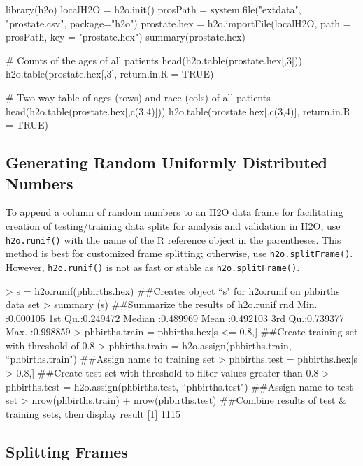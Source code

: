 \documentclass[11pt]{article}
\begin{document}
\begin{enumerate}
\begin{spverbatim}

library(h2o)
localH2O = h2o.init()
prosPath = system.file("extdata", "prostate.csv", package="h2o")
prostate.hex = h2o.importFile(localH2O, path = prosPath, key = "prostate.hex")
summary(prostate.hex)

# Counts of the ages of all patients
head(h2o.table(prostate.hex[,3]))
h2o.table(prostate.hex[,3], return.in.R = TRUE)

# Two-way table of ages (rows) and race (cols) of all patients
head(h2o.table(prostate.hex[,c(3,4)]))
h2o.table(prostate.hex[,c(3,4)], return.in.R = TRUE)
\end{spverbatim}


\subsection{Generating Random Uniformly Distributed Numbers}

To append a column of random numbers to an H2O data frame for facilitating creation of testing/training data splits for analysis and validation in H2O, use {\texttt{h2o.runif()}} with the name of the R reference object in the parentheses. This method is best for customized frame splitting; otherwise, use {\texttt{h2o.splitFrame()}}. However, {\texttt{h2o.runif()}} is not as fast or stable as {\texttt{h2o.splitFrame()}}. 

\begin{spverbatim}
> s = h2o.runif(phbirths.hex) ##Creates object “s" for h2o.runif on phbirths data set
> summary (s)  ##Summarize the results of h2o.runif
 rnd               
 Min.   :0.000105  
 1st Qu.:0.249472  
 Median :0.489969  
 Mean   :0.492103  
 3rd Qu.:0.739377  
 Max.   :0.998859  
> phbirths.train = phbirths.hex[s <= 0.8,] ##Create training set with threshold of 0.8
> phbirths.train = h2o.assign(phbirths.train, “phbirths.train") ##Assign name to training set
> phbirths.test = phbirths.hex[s > 0.8,] ##Create test set with threshold to filter values greater than 0.8
> phbirths.test = h2o.assign(phbirths.test, “phbirths.test") ##Assign name to test set
> nrow(phbirths.train) + nrow(phbirths.test) ##Combine results of test & training sets, then display result
[1] 1115
\end{spverbatim}
 

\subsection{Splitting Frames}


\end{enumerate}
\end{document}
